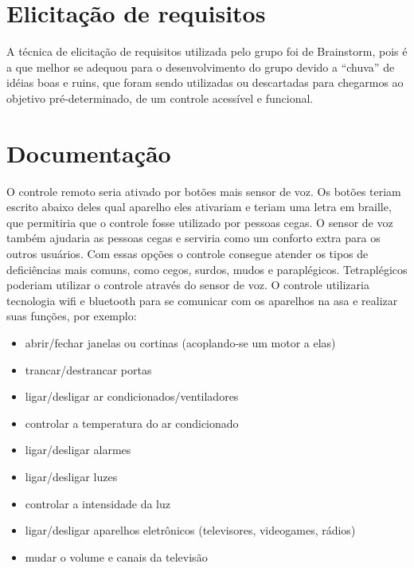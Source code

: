 \documentclass[12pt,a4paper]{article} \usepackage[utf8]{inputenc}
\begin{document}
\section{Elicitação de requisitos} A técnica de elicitação de requisitos
utilizada pelo grupo foi de Brainstorm, pois é a que melhor se adequou para o
desenvolvimento do grupo devido a “chuva” de idéias boas e ruins, que foram
sendo utilizadas ou descartadas para chegarmos ao objetivo pré-determinado,  de
um controle acessível e funcional.

\section{Documentação} O controle remoto seria ativado por botões mais sensor
de voz. Os botões teriam escrito abaixo deles qual aparelho eles ativariam e
teriam uma letra em braille, que permitiria que o controle fosse utilizado por
pessoas cegas. O sensor de voz também ajudaria as pessoas cegas e serviria como
um conforto extra para os outros usuários. Com essas opções o controle consegue
atender os tipos de deficiências mais comuns, como cegos, surdos, mudos e
paraplégicos. Tetraplégicos poderiam utilizar o controle através do sensor de
voz.  O controle utilizaria tecnologia wifi e bluetooth para se comunicar com
os aparelhos na asa e realizar suas funções, por exemplo:

\begin{itemize}
	\item abrir/fechar janelas ou cortinas (acoplando-se um motor a elas)
	\item trancar/destrancar portas
	\item ligar/desligar ar
		condicionados/ventiladores
	\item controlar a temperatura do ar condicionado
	\item ligar/desligar alarmes
	\item ligar/desligar luzes
	\item controlar a intensidade da luz
	\item ligar/desligar aparelhos eletrônicos (televisores,
videogames, rádios)
\item mudar o volume e canais da televisão
\end{itemize}
\end{document}
